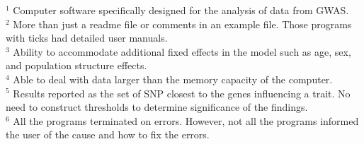 \documentclass{article}
\begin{document}
\begin{table}
\begin{tabular}{lccccccccc}
\end{tabular}
{$^1$ \scriptsize{Computer software specifically designed for the analysis of data from GWAS.}}\\
{$^2$ \scriptsize{More than just a readme file or comments in an example file. Those programs with ticks had detailed user manuals.}}\\
{$^3$ \scriptsize{Ability to accommodate additional fixed effects in the model such as age, sex, and population structure effects.}} \\
{$^4$ \scriptsize{Able to deal with data larger than the memory capacity of the computer.}} \\
{$^5$ \scriptsize{Results reported as the set of SNP closest to the genes influencing a trait. No need to construct thresholds to determine 
significance of the findings.}}\\
{$^6$  \scriptsize{All the programs terminated on errors. However, not all the programs informed the user of the cause and how to fix the errors.}}\\
\end{table}
\end{document}

